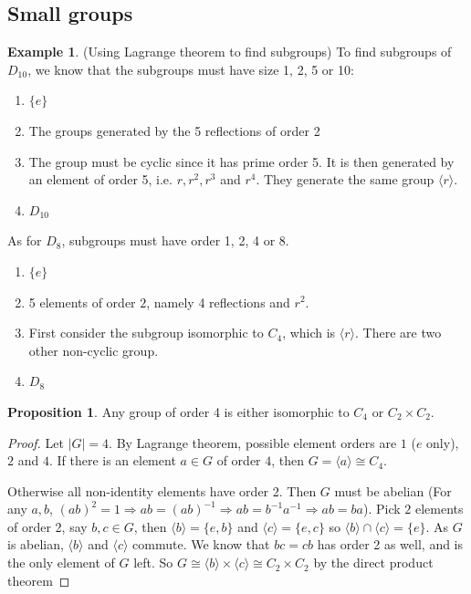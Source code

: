 \documentclass[a4paper]{article}
\theoremstyle{definition}
\newtheorem*{prop}{Proposition}
\newtheorem*{eg}{Example}
\newcommand{\bra}{\langle}
\newcommand{\ket}{\rangle}
\begin{document}
\subsection{Small groups}
\begin{eg}
  (Using Lagrange theorem to find subgroups) To find subgroups of $D_{10}$, we know that the subgroups must have size 1, 2, 5 or 10:
  \begin{enumerate}[label=\arabic{*}:]
  \item $\{e\}$
  \item The groups generated by the 5 reflections of order 2
  \setcounter{enumi}{4}
  \item The group must be cyclic since it has prime order 5. It is then generated by an element of order 5, i.e. $r, r^2, r^3$ and $r^4$. They generate the same group $\bra r\ket$.
    \setcounter{enumi}{9}
  \item $D_{10}$
  \end{enumerate}

  As for $D_8$, subgroups must have order 1, 2, 4 or 8.
  \begin{enumerate}[label=\arabic{*}:]
  \item $\{e\}$
  \item 5 elements of order $2$, namely 4 reflections and $r^2$.
  \setcounter{enumi}{3}
  \item First consider the subgroup isomorphic to $C_4$, which is $\bra r\ket$. There are two other non-cyclic group.
    \setcounter{enumi}{7}
  \item $D_8$
  \end{enumerate}
\end{eg}

\begin{prop}
  Any group of order 4 is either isomorphic to $C_4$ or $C_2\times C_2$.
\end{prop}

\begin{proof}
  Let $|G| = 4$. By Lagrange theorem, possible element orders are $1$ ($e$ only), $2$ and $4$. If there is an element $a\in G$ of order $4$, then $G = \bra a\ket \cong C_4$.

  Otherwise all non-identity elements have order 2. Then $G$ must be abelian (For any $a, b$, $(ab)^2 = 1 \Rightarrow ab = (ab)^{-1} \Rightarrow ab = b^{-1}a^{-1} \Rightarrow ab = ba$).
  Pick $2$ elements  of order 2, say $b, c\in G$, then $\bra b\ket=\{e, b\}$ and $\bra c\ket = \{e, c\}$ so $\bra b\ket\cap \bra c\ket = \{e\}$. As $G$ is abelian, $\bra b\ket$ and $\bra c\ket$ commute. We know that $bc = cb$ has order 2 as well, and is the only element of $G$ left. So $G \cong \bra b\ket\times \bra c\ket \cong C_2\times C_2$ by the direct product theorem
\end{proof}
\end{document}
